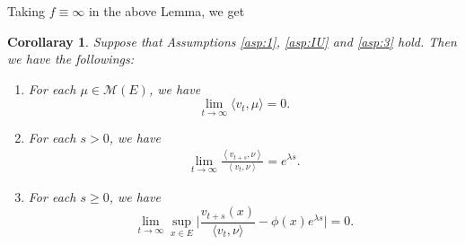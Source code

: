 \documentclass[12pt,a4paper]{amsart}
\numberwithin{equation}{section}
\theoremstyle{plain}
\newtheorem{cor}[thm]{Corollaray}
\theoremstyle{definition}
\begin{document}
Taking $f \equiv \infty$ in the above Lemma, we get
\begin{cor}
\label{lem:extinct}
  Suppose that Assumptions \ref{asp:1}, \ref{asp:IU} and \ref{asp:3} hold.
  Then we have the followings:
  \begin{enumerate}
  \item \label{lem:extinct_2}
    For each $\mu \in \mathcal M(E)$, we have
    \[
      \lim_{t\rightarrow\infty}\langle v_t,\mu\rangle=0.
    \]
   \item \label{lem:extinct_2_1}
For each $s>0$, we have
     \begin{align}
       \lim_{t\to \infty} \frac{\left\langle v_{t+s},\nu\right\rangle}{\left\langle v_t,\nu\right\rangle} 
= e^{\lambda s}.
     \end{align}
  \item \label{lem:extinct:3}
    For each $s\geq 0$, we have
    \begin{equation} \label{eq:ont_point_ratio_limit}
      \lim_{t\to \infty} \sup_{x\in E}\Big|\frac{v_{t+s}(x)}{\langle v_t,\nu\rangle } - \phi(x)e^{\lambda s} \Big|
      =0.
    \end{equation}
  \end{enumerate}
\end{cor}
\end{document}
